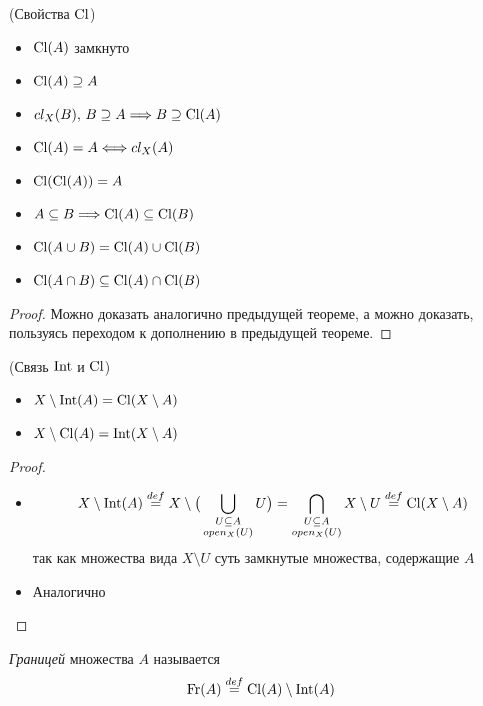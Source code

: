 \begin{theorem}(Свойства $\operatorname{Cl}$)
    \enewline
    \begin{itemize}
        \item $\operatorname{Cl}(A)$ замкнуто
        \item $\operatorname{Cl}(A) \supseteq A$
        \item $cl_X(B),\, B \supseteq A \Longrightarrow B \supseteq \operatorname{Cl}(A)$
        \item $\operatorname{Cl}(A) = A \Longleftrightarrow cl_X(A)$
        \item $\operatorname{Cl}(\operatorname{Cl}(A)) = A$
        \item $A \subseteq B \Longrightarrow \operatorname{Cl}(A) \subseteq \operatorname{Cl}(B)$
        \item $\operatorname{Cl}(A \cup B) = \operatorname{Cl}(A) \cup \operatorname{Cl}(B)$
        \item $\operatorname{Cl}(A \cap B) \subseteq \operatorname{Cl}(A) \cap \operatorname{Cl}(B)$
    \end{itemize}
\end{theorem}
\begin{proof}
    Можно доказать аналогично предыдущей теореме, а можно доказать, пользуясь
    переходом к дополнению в предыдущей теореме.
\end{proof}

\begin{theorem}(Связь $\operatorname{Int}$ и $\operatorname{Cl}$)
    \begin{itemize}
        \item $X \setminus \operatorname{Int}(A) = \operatorname{Cl}(X \setminus A)$
        \item $X \setminus \operatorname{Cl}(A) = \operatorname{Int}(X \setminus A)$
    \end{itemize}
\end{theorem}
\begin{proof}
    \enewline
    \begin{itemize}
        \item $$ X \setminus \operatorname{Int}(A) \overset{def}{\underset{}{=}} X \setminus
        \big( \bigcup_{\substack{U \subseteq A \\open_X(U)}}{U} \big) =
        \bigcap_{\substack{U \subseteq A \\open_X(U)}}{X \setminus U} \overset{def}{\underset{}{=}}
        \operatorname{Cl}(X \setminus A) $$
        так как множества вида $X \setminus U$ суть замкнутые множества,
        содержащие $A$
        \item Аналогично
    \end{itemize}
\end{proof}

\begin{definition}
    \textit{Границей} множества $A$ называется
\[
    \operatorname{Fr}(A) \overset{def}{\underset{}{=}} \operatorname{Cl}(A) \setminus \operatorname{Int}(A)
\]
\end{definition}

